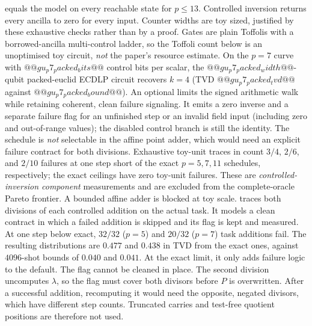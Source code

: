 equals the model on every reachable state for $p\le13$. Controlled inversion
returns every ancilla to zero for every input. Counter widths are toy sized,
justified by these exhaustive checks rather than by a proof. Gates are plain
Toffolis with a borrowed-ancilla multi-control ladder, so the Toffoli count
below is an unoptimised toy circuit, \emph{not} the paper's resource estimate.
On the $p=7$ curve with $@@gu_p7_packed_bits@@$ control bits per scalar, the
$@@gu_p7_packed_width@@$-qubit packed-euclid ECDLP circuit recovers $k=4$
(TVD $@@gu_p7_packed_tvd@@$ against $@@gu_p7_packed_bound@@$).
An optional  limits the
signed arithmetic walk while retaining coherent, clean failure signaling.
It emits a zero inverse and a separate failure flag for an unfinished step
or an invalid field input (including zero and out-of-range values); the
disabled control branch is still the identity. The schedule is \emph{not}
selectable in the affine point adder, which would need an explicit failure
contract for both divisions. Exhaustive toy-unit traces in
 count $3/4$, $2/6$, and $2/10$ failures at
one step short of the exact $p=5,7,11$ schedules, respectively; the exact
ceilings have zero toy-unit failures. These are \emph{controlled-inversion
component} measurements and are excluded from the complete-oracle
Pareto frontier. A bounded affine adder is blocked at toy scale.
 traces both divisions of each
controlled addition on the actual task. It models a clean contract in which a
failed addition is skipped and its flag is kept and measured. At one step
below exact, $32/32$ ($p=5$) and $20/32$ ($p=7$) task additions fail. The
resulting distributions are $0.477$ and $0.438$ in TVD from the exact ones,
against $4096$-shot bounds of $0.040$ and $0.041$. At the exact limit, it only
adds failure logic to the default. The flag cannot be cleaned in place. The
second division uncomputes $\lambda$, so the flag must cover both divisors
before $P$ is overwritten. After a successful addition, recomputing it would
need the opposite, negated divisors, which have different step counts. Truncated
carries and test-free quotient positions are therefore not used.

